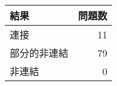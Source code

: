 \begin{tabular}{l|r} \hline
  結果 & 問題数 \\ \hline
  連接 & 11 \\ \hline
  部分的非連結 & 79 \\ \hline
  非連結 & 0 \\ \hline
\end{tabular}